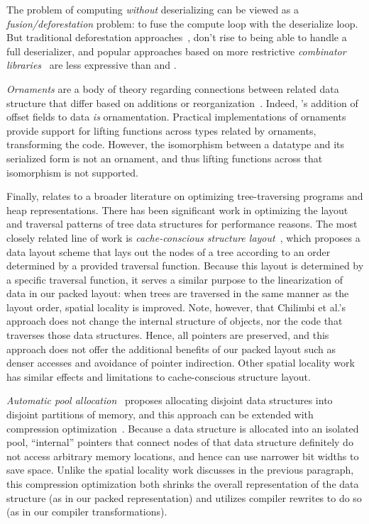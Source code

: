 \documentclass[showabstract,showacknowledgments,showpreface,showdedication]{iuphd}
\theoremstyle{nonumberplain}
\begin{document}
The problem of computing \emph{without} deserializing can be viewed as a
\emph{{fusion/deforestation}} problem: to fuse the compute loop with the
deserialize loop.  But traditional deforestation
approaches~\cite{wadler-deforestation}, don't rise to being able to handle
a full deserializer, and popular approaches based on more restrictive {\em combinator
libraries}~\cite{stream-fusion} are less expressive than \lamadt and \ourcalc.

\emph{Ornaments} are a body of theory regarding connections between related
data structure that differ based on additions or
reorganization~\cite{ornaments}.
%
Indeed, \ourcalc's addition of offset fields to data {\em is} ornamentation.
%
Practical implementations of ornaments~\cite{ornament-ml} provide support for
lifting functions across types related by ornaments, transforming the code.
%
However, the isomorphism between a datatype and its serialized form is not an
ornament, and thus lifting functions across that isomorphism is not supported.



Finally, \ourcalc relates to a broader literature on optimizing
tree-traversing programs and heap representations.
%
There has been significant work in optimizing the layout and
traversal patterns of tree data structures for performance reasons.
%
The most closely related line of work is \emph{cache-conscious structure
  layout}~\cite{chilimbi1999}, which proposes a data layout scheme that lays out
the nodes of a tree according to an order determined by a provided traversal
function. Because this layout is determined by a specific traversal function,
it serves a similar purpose to the linearization of data in our packed layout:
when trees are traversed in the same manner as the layout order, spatial
locality is improved. Note, however, that Chilimbi et al.'s approach does not
change the internal structure of objects, nor the code that traverses those
data structures. Hence, all pointers are preserved, and this approach does not
offer the additional benefits of our packed layout such as denser accesses and
avoidance of pointer indirection. Other spatial locality
work~\cite{Truong1998,Lattner2005,Chilimbi1999a} has similar effects and
limitations to cache-conscious structure layout.

\emph{Automatic pool allocation}~\cite{Lattner2005} proposes
allocating disjoint data structures into disjoint partitions of
memory, and this approach can be extended with compression
optimization~\cite{Lattner2005mspc}. Because a data structure is
allocated into an isolated pool, ``internal'' pointers that connect
nodes of that data structure definitely do not access arbitrary memory
locations, and hence can use narrower bit widths to save space. Unlike
the spatial locality work discusses in the previous paragraph, this
compression optimization both shrinks the overall representation of
the data structure (as in our packed representation) and utilizes
compiler rewrites to do so (as in our compiler transformations).
\end{document}
